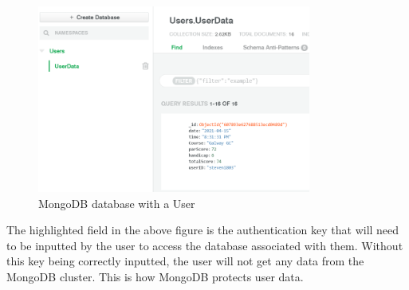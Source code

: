 \begin{figure}[H]
    \centering
    \includegraphics[width=9cm]{img/UserDatabase.png}
    \caption{MongoDB database with a User}
    \label{fig:MongoDB database with a User}
\end{figure}
The highlighted field in the above figure is the authentication key that will need to be inputted by the user to access the database associated with them. Without this key being correctly inputted, the user will not get any data from the MongoDB cluster. This is how MongoDB protects user data.
